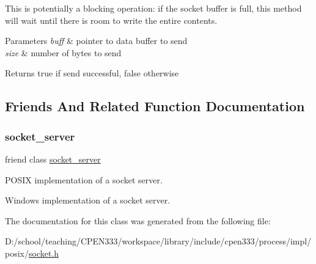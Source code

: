 This is potentially a blocking operation\+: if the socket buffer is full, this method will wait until there is room to write the entire contents.


\begin{DoxyParams}{Parameters}
{\em buff} & pointer to data buffer to send \\
\hline
{\em size} & number of bytes to send \\
\hline
\end{DoxyParams}
\begin{DoxyReturn}{Returns}
true if send successful, false otherwise 
\end{DoxyReturn}


\subsection{Friends And Related Function Documentation}
\mbox{\label{classcpen333_1_1process_1_1posix_1_1socket_aba37c0ea463da9263b0712d3b3389066}} 
\subsubsection{\texorpdfstring{socket\+\_\+server}{socket\_server}}
{\footnotesize\ttfamily friend class \hyperlink{classcpen333_1_1process_1_1posix_1_1socket__server}{socket\+\_\+server}\hspace{0.3cm}{\ttfamily [friend]}}



P\+O\+S\+IX implementation of a socket server. 

Windows implementation of a socket server. 

The documentation for this class was generated from the following file\+:\begin{DoxyCompactItemize}
\item 
D\+:/school/teaching/\+C\+P\+E\+N333/workspace/library/include/cpen333/process/impl/posix/\hyperlink{impl_2posix_2socket_8h}{socket.\+h}\end{DoxyCompactItemize}
